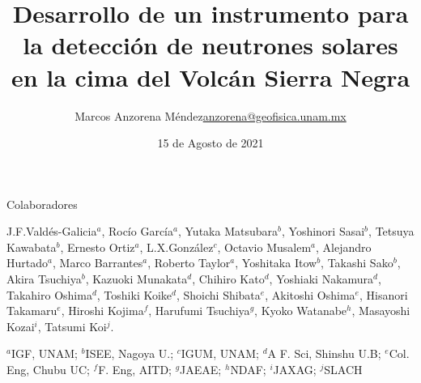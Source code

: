\documentclass[spanish,aspectratio=169]{beamer}
\title [Desarrollo de un instrumento para la detección de neutrones solares]{Desarrollo de un instrumento para la detección de neutrones solares en la cima del Volcán Sierra Negra}
\author{\texorpdfstring{Marcos Anzorena Méndez\newline\url{anzorena@geofisica.unam.mx}}{Marcos Anzorena Méndez}}
\date{15 de Agosto de 2021}
\institute{Instituto de Geofísica\\
Universidad Nacional Autónoma de México}
\begin{document}
\maketitle

\begin{frame}{Colaboradores}

 J.F.Valdés-Galicia$^{a}$, Rocío García$^{a}$, Yutaka Matsubara$^{b}$, Yoshinori Sasai$^{b}$, Tetsuya Kawabata$^{b}$, Ernesto Ortiz$^{a}$, L.X.González$^{c}$, Octavio Musalem$^{a}$, Alejandro Hurtado$^{a}$, Marco Barrantes$^{a}$, Roberto Taylor$^{a}$, Yoshitaka Itow$^{b}$, Takashi Sako$^{b}$, Akira Tsuchiya$^{b}$, Kazuoki Munakata$^{d}$, Chihiro Kato$^{d}$, Yoshiaki Nakamura$^{d}$, Takahiro Oshima$^{d}$, Toshiki Koike$^{d}$, Shoichi Shibata$^{e}$, Akitoshi Oshima$^{e}$, Hisanori Takamaru$^{e}$, Hiroshi Kojima$^{f}$, Harufumi Tsuchiya$^{g}$, Kyoko Watanabe$^{h}$, Masayoshi Kozai$^{i}$, Tatsumi Koi$^{j}$.

$^a$IGF, UNAM; $^b$ISEE, Nagoya U.; $^c$IGUM, UNAM; $^d$A F. Sci, Shinshu U.B; $^e$Col. Eng, Chubu UC; $^f$F. Eng, AITD; $^g$JAEAE; $^h$NDAF; $^i$JAXAG; $^j$SLACH

\end{frame}
\end{document}
